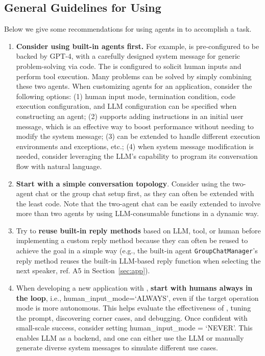 \subsection{General Guidelines for Using \libName}
\label{sec:guideline}

Below we give some recommendations for using agents in \libName to accomplish a task. 
\begin{enumerate}[leftmargin=*]
    \vspace{-1mm}
    \setlength\itemsep{-0.1em}
\item {\bf Consider using built-in agents first.} For example, \AssistantAgent is pre-configured to be backed by GPT-4, with a carefully designed system message for generic problem-solving via code. The \UserProxyAgent is configured to solicit human inputs and perform tool execution. Many problems can be solved by simply combining these two agents. When customizing agents for an application, consider the following options: (1) human input mode, termination condition, code execution configuration, and LLM configuration can be specified when constructing an agent; (2) \libName supports adding instructions in an initial user message, which is an effective way to boost performance without needing to modify the system message; (3) \UserProxyAgent can be extended to handle different execution environments and exceptions, etc.; (4) when system message modification is needed, consider leveraging the LLM's capability to program its conversation flow with natural language. 

\item {\bf Start with a simple conversation topology}. Consider using the two-agent chat or the group chat setup first, as they can often be extended with the least code. Note that the two-agent chat can be easily extended to involve more than two agents by using LLM-consumable functions in a dynamic way. 
\item Try to {\bf reuse built-in reply methods} based on LLM, tool, or human before implementing a custom reply method because they can often be reused to achieve the goal in a simple way (e.g., the built-in agent \texttt{GroupChatManager}'s reply method reuses the built-in LLM-based reply function when selecting the next speaker, ref. A5 in Section~\ref{sec:app}). 
\item When developing a new application with \UserProxyAgent, {\bf start with humans always in the loop}, i.e., human\_input\_mode=`ALWAYS', even if the target operation mode is more autonomous. This helps evaluate the effectiveness of \AssistantAgent, tuning the prompt, discovering corner cases, and debugging. Once confident with small-scale success, consider 
setting human\_input\_mode = `NEVER'.
This enables LLM as a backend, and one can either use the LLM or manually generate diverse system messages to simulate different use cases. 


\end{enumerate}
